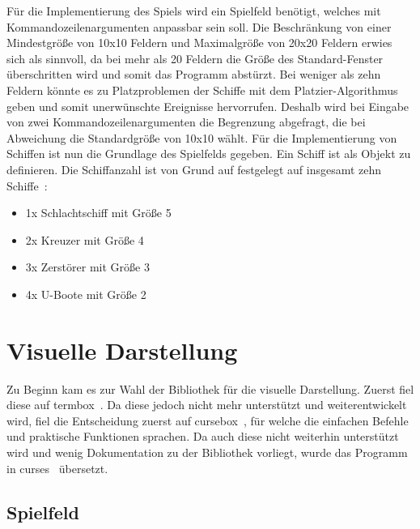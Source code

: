 \documentclass{llncs}
\begin{document}
Für die Implementierung des Spiels wird ein Spielfeld benötigt, welches mit Kommandozeilenargumenten anpassbar sein soll. Die Beschränkung von einer Mindestgröße von 10x10 Feldern und Maximalgröße von 20x20
Feldern erwies sich als sinnvoll, da bei mehr als 20 Feldern die Größe des Standard-Fenster überschritten wird und somit das Programm abstürzt.
Bei weniger als zehn Feldern könnte es zu Platzproblemen der Schiffe mit dem Platzier-Algorithmus geben und somit unerwünschte Ereignisse hervorrufen.
Deshalb wird bei Eingabe von zwei Kommandozeilenargumenten die Begrenzung abgefragt, die bei Abweichung die Standardgröße von 10x10 wählt.
Für die Implementierung von Schiffen ist nun die Grundlage des Spielfelds gegeben. Ein Schiff ist als Objekt zu definieren.
Die Schiffanzahl ist von Grund auf festgelegt auf insgesamt zehn Schiffe~\cite{Schiffeversenken}:
\begin{itemize}
  \item 1x Schlachtschiff mit Größe 5
  \item 2x Kreuzer mit Größe 4
  \item 3x Zerstörer mit Größe 3
  \item 4x U-Boote mit Größe 2
\end{itemize}

\section{Visuelle Darstellung}

Zu Beginn kam es zur Wahl der Bibliothek für die visuelle Darstellung. Zuerst fiel diese auf termbox~\cite{Termbox}. Da diese jedoch nicht mehr unterstützt und weiterentwickelt wird, fiel die Entscheidung zuerst auf cursebox~\cite{Cursebox}, für welche
die einfachen Befehle und praktische Funktionen sprachen. Da auch diese nicht weiterhin unterstützt wird und wenig Dokumentation zu der Bibliothek vorliegt, wurde das Programm in curses~\cite{Curses} übersetzt.

\subsection{Spielfeld}
\end{document}
